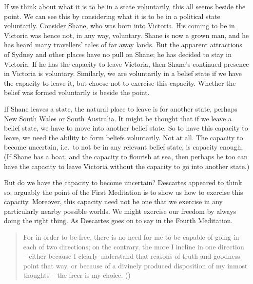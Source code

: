 \documentclass[
  11pt,
  letterpaper,
  DIV=11,
  numbers=noendperiod,
  twoside]{scrartcl}
\begin{document}
If we think about what it is to be in a state voluntarily, this all
seems beside the point. We can see this by considering what it is to be
in a political state voluntarily. Consider Shane, who was born into
Victoria. His coming to be in Victoria was hence not, in any way,
voluntary. Shane is now a grown man, and he has heard many travellers'
tales of far away lands. But the apparent attractions of Sydney and
other places have no pull on Shane; he has decided to stay in Victoria.
If he has the capacity to leave Victoria, then Shane's continued
presence in Victoria is voluntary. Similarly, we are voluntarily in a
belief state if we have the capacity to leave it, but choose not to
exercise this capacity. Whether the belief was formed voluntarily is
beside the point.

If Shane leaves a state, the natural place to leave is for another
state, perhaps New South Wales or South Australia. It might be thought
that if we leave a belief state, we have to move into another belief
state. So to have this capacity to leave, we need the ability to form
beliefs voluntarily. Not at all. The capacity to become uncertain,
i.e.~to not be in any relevant belief state, is capacity enough. (If
Shane has a boat, and the capacity to flourish at sea, then perhaps he
too can have the capacity to leave Victoria without the capacity to go
into another state.)

But do we have the capacity to become uncertain? Descartes appeared to
think so; arguably the point of the First Meditation is to show us how
to exercise this capacity. Moreover, this capacity need not be one that
we exercise in any particularly nearby possible worlds. We might
exercise our freedom by always doing the right thing. As Descartes goes
on to say in the Fourth Meditation.

\begin{quote}
For in order to be free, there is no need for me to be capable of going
in each of two directions; on the contrary, the more I incline in one
direction -- either because I clearly understand that reasons of truth
and goodness point that way, or because of a divinely produced
disposition of my inmost thoughts -- the freer is my choice.
()
\end{quote}
\end{document}
